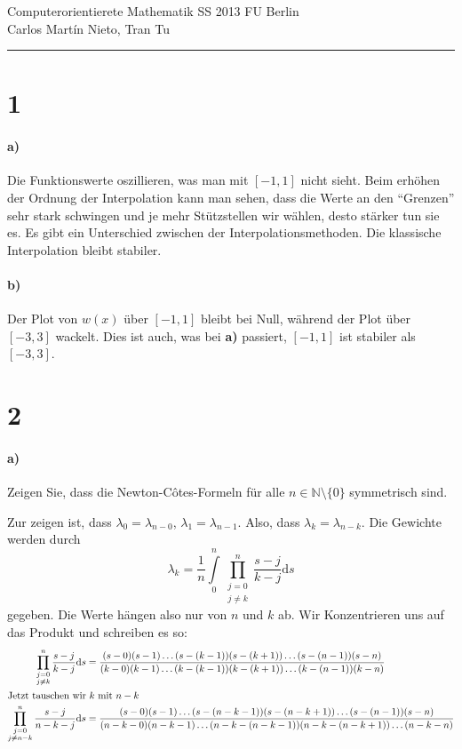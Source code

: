 \documentclass[ngerman,a4paper]{scrartcl}
\newcommand{\N}{\ensuremath{\mathbb{N}}}
\begin{document}
{\sffamily
  \hfill
  Computerorientierete Mathematik SS 2013\hfill
  FU Berlin\\[8pt]
  \hfill Carlos Martín Nieto, Tran Tu\hrule \bigskip
}

\section*{1}

\paragraph{a)}

Die Funktionswerte oszillieren, was man mit $[-1,1]$ nicht sieht. Beim
erhöhen der Ordnung der Interpolation kann man sehen, dass die Werte
an den "`Grenzen"' sehr stark schwingen und je mehr Stützstellen wir
wählen, desto stärker tun sie es. Es gibt ein Unterschied zwischen der
Interpolationsmethoden. Die klassische Interpolation bleibt stabiler.

\paragraph{b)}

Der Plot von $w(x)$ über $[-1,1]$ bleibt bei Null, während der Plot
über $[-3,3]$ wackelt. Dies ist auch, was bei \textbf{a)} passiert,
$[-1,1]$ ist stabiler als $[-3,3]$.

\section*{2}

\paragraph{a)}

Zeigen Sie, dass die Newton-Côtes-Formeln für alle
$n\in\N\setminus\{0\}$ symmetrisch sind.

Zur zeigen ist, dass $\lambda_0 = \lambda_{n-0}$, $\lambda_1 =
\lambda_{n-1}$. Also, dass $\lambda_k = \lambda_{n-k}$. Die Gewichte
werden durch
\[
\lambda_k = \frac{1}{n} \int\limits^n_0\prod^n_{\substack{j=0\\j\neq k}} \frac{s-j}{k-j}\text{d}s
\]
gegeben. Die Werte hängen also nur von $n$ und $k$ ab. Wir
Konzentrieren uns auf das Produkt und schreiben es so:
\begin{align*}
  \prod^n_{\substack{j=0\\j\neq k}} \frac{s-j}{k-j}\text{d}s &= \frac{(s-0)(s-1)\dots(s-(k-1))(s-(k+1))\dots(s-(n-1))(s-n)}
  {(k-0)(k-1)\dots(k-(k-1))(k-(k+1))\dots(k-(n-1))(k-n)}\\
  \intertext{Jetzt tauschen wir $k$ mit $n-k$}
  \prod^n_{\substack{j=0\\j\neq n-k}} \frac{s-j}{n-k-j}\text{d}s &= \frac{(s-0)(s-1)\dots(s-(n-k-1))(s-(n-k+1))\dots(s-(n-1))(s-n)}
  {(n-k-0)(n-k-1)\dots(n-k-(n-k-1))(n-k-(n-k+1))\dots(n-k-n)}
\end{align*}
\end{document}
